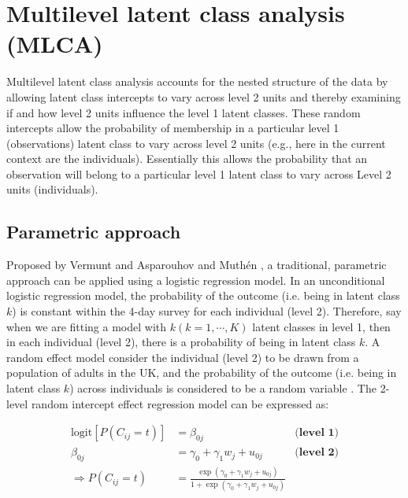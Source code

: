 
\section{Multilevel latent class analysis (MLCA)}\vspace{-0.3cm}


Multilevel latent class analysis accounts for the nested structure of the data by allowing latent class intercepts to vary across level 2 units and thereby examining if and how level 2 units influence the level 1 latent classes. These random intercepts allow the probability of
membership in a particular level 1 (observations) latent class to vary across level 2 units (e.g., here in the current context are the individuals). Essentially this allows the probability that an observation will belong to a
particular level 1 latent class to vary across Level 2 units (individuals). \vspace{-0.5cm}

\subsection{Parametric approach}\vspace{-0.3cm}

Proposed by Vermunt \parencite{Vermunt, vermunt2008latent} and Asparouhov and Muth\'en \parencite{muthen2009multilevel},  a traditional, parametric approach can be applied using a logistic regression model. In an unconditional logistic regression model, the probability of the outcome (i.e. being in latent class $k$) is constant within the 4-day survey for each individual (level 2). Therefore, say when we are fitting a model with $k (k = 1, \cdots, K)$ latent classes in level 1, then in each individual (level 2), there is a probability of being in latent class $k$. A random effect model consider the individual (level 2) to be drawn from a population of adults in the UK, and the probability of the outcome (i.e. being in latent class $k$) across individuals is considered to be a random variable \parencite{snijders2011multilevel}. The 2-level random intercept effect regression model can be expressed as:\vspace{-0.4cm}


\begin{equation}
\begin{aligned}
\text{logit}[P(C_{ij} = t)] & = \beta_{0j} & \textbf{(level 1)}  \\
\beta_{0j} & = \gamma_0 + \gamma_1 w_j + u_{0j} & \textbf{(level 2)} \\ 
\Rightarrow P(C_{ij} = t) & = \frac{\exp{(\gamma_0 + \gamma_1 w_j + u_{0j})}}{1 + \exp{(\gamma_0 + \gamma_1 w_j + u_{0j})}} \\
\end{aligned}
\label{randomLCA}
\end{equation}
\vspace{-0.3cm}

